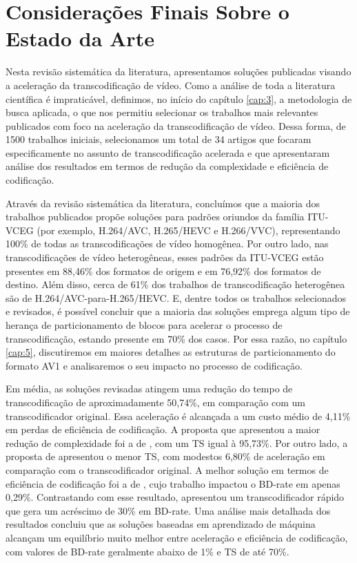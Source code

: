 \section{Considerações Finais Sobre o Estado da Arte}
\label{cap:3.4}

Nesta revisão sistemática da literatura, apresentamos soluções publicadas visando a aceleração da transcodificação de vídeo. Como a análise de toda a literatura científica é impraticável, definimos, no início do capítulo \ref{cap:3}, a metodologia de busca aplicada, o que nos permitiu selecionar os trabalhos mais relevantes publicados com foco na aceleração da transcodificação de vídeo. Dessa forma, de 1500 trabalhos iniciais, selecionamos um total de 34 artigos que focaram especificamente no assunto de transcodificação acelerada e que apresentaram análise dos resultados em termos de redução da complexidade e eficiência de codificação. 

Através da revisão sistemática da literatura, concluímos que a maioria dos trabalhos publicados propõe soluções para padrões oriundos da família ITU-VCEG (por exemplo, H.264/AVC, H.265/HEVC e H.266/VVC), representando 100\% de todas as transcodificações de vídeo homogênea. Por outro lado, nas transcodificações de vídeo heterogêneas, esses padrões da ITU-VCEG estão presentes em 88,46\% dos formatos de origem e em 76,92\% dos formatos de destino. Além disso, cerca de 61\% dos trabalhos de transcodificação heterogênea são de H.264/AVC-para-H.265/HEVC. E, dentre todos os trabalhos selecionados e revisados, é possível concluir que a maioria das soluções emprega algum tipo de herança de particionamento de blocos para acelerar o processo de transcodificação, estando presente em 70\% dos casos. Por essa razão, no capítulo \ref{cap:5}, discutiremos em maiores detalhes as estruturas de particionamento do formato AV1 e analisaremos o seu impacto no processo de codificação.

Em média, as soluções revisadas atingem uma redução do tempo de transcodificação de aproximadamente 50,74\%, em comparação com um transcodificador original. Essa aceleração é alcançada a um custo médio de 4,11\% em perdas de eficiência de codificação. A proposta que apresentou a maior redução de complexidade foi a de \citet{bib:leuven_2011}, com um TS igual à 95,73\%. Por outro lado, a proposta de \citet{bib:aminlou_2016} apresentou o menor TS, com modestos 6,80\% de aceleração em comparação com o transcodificador original. A melhor solução em termos de eficiência de codificação foi a de \citet{bib:grellert_2018}, cujo trabalho impactou o BD-rate em apenas 0,29\%. Contrastando com esse resultado, \citet{bib:zhang_2012} apresentou um transcodificador rápido que gera um acréscimo de 30\% em BD-rate. Uma análise mais detalhada dos resultados concluiu que as soluções baseadas em aprendizado de máquina alcançam um equilíbrio muito melhor entre aceleração e eficiência de codificação, com valores de BD-rate geralmente abaixo de 1\% e TS de até 70\%.

